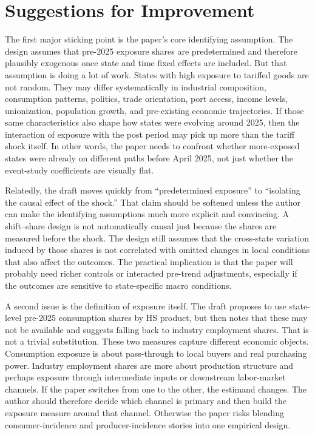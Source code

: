 \documentclass[12pt]{article}
\begin{document}
\section{Suggestions for Improvement}

The first major sticking point is the paper's core identifying assumption. The design assumes that pre-2025 exposure shares are predetermined and therefore plausibly exogenous once state and time fixed effects are included. But that assumption is doing a lot of work. States with high exposure to tariffed goods are not random. They may differ systematically in industrial composition, consumption patterns, politics, trade orientation, port access, income levels, unionization, population growth, and pre-existing economic trajectories. If those same characteristics also shape how states were evolving around 2025, then the interaction of exposure with the post period may pick up more than the tariff shock itself. In other words, the paper needs to confront whether more-exposed states were already on different paths before April 2025, not just whether the event-study coefficients are visually flat.

Relatedly, the draft moves quickly from ``predetermined exposure'' to ``isolating the causal effect of the shock.'' That claim should be softened unless the author can make the identifying assumptions much more explicit and convincing. A shift--share design is not automatically causal just because the shares are measured before the shock. The design still assumes that the cross-state variation induced by those shares is not correlated with omitted changes in local conditions that also affect the outcomes. The practical implication is that the paper will probably need richer controls or interacted pre-trend adjustments, especially if the outcomes are sensitive to state-specific macro conditions.

A second issue is the definition of exposure itself. The draft proposes to use state-level pre-2025 consumption shares by HS product, but then notes that these may not be available and suggests falling back to industry employment shares. That is not a trivial substitution. These two measures capture different economic objects. Consumption exposure is about pass-through to local buyers and real purchasing power. Industry employment shares are more about production structure and perhaps exposure through intermediate inputs or downstream labor-market channels. If the paper switches from one to the other, the estimand changes. The author should therefore decide which channel is primary and then build the exposure measure around that channel. Otherwise the paper risks blending consumer-incidence and producer-incidence stories into one empirical design.
\end{document}
